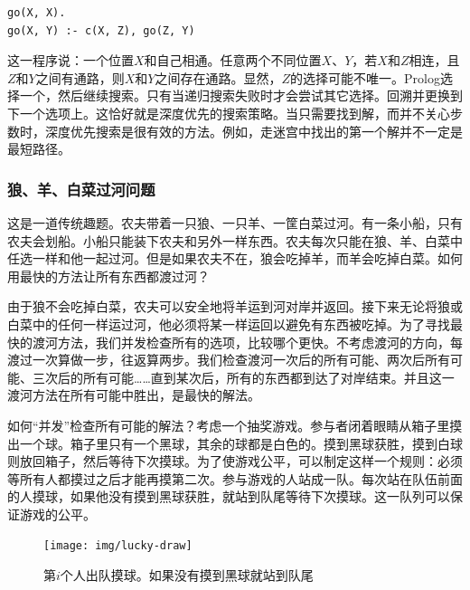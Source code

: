 \documentclass[b5paper]{ctexart}
\begin{document}
\lstset{language=Prolog}
\begin{lstlisting}
go(X, X).
go(X, Y) :- c(X, Z), go(Z, Y)
\end{lstlisting}

这一程序说：一个位置$X$和自己相通。任意两个不同位置$X$、$Y$，若$X$和$Z$相连，且$Z$和$Y$之间有通路，则$X$和$Y$之间存在通路。显然，$Z$的选择可能不唯一。Prolog选择一个，然后继续搜索。只有当递归搜索失败时才会尝试其它选择。回溯并更换到下一个选项上。这恰好就是深度优先的搜索策略。当只需要找到解，而并不关心步数时，深度优先搜索是很有效的方法。例如，走迷宫中找出的第一个解并不一定是最短路径。

\subsubsection{狼、羊、白菜过河问题}

这是一道传统趣题。农夫带着一只狼、一只羊、一筐白菜过河。有一条小船，只有农夫会划船。小船只能装下农夫和另外一样东西。农夫每次只能在狼、羊、白菜中任选一样和他一起过河。但是如果农夫不在，狼会吃掉羊，而羊会吃掉白菜。如何用最快的方法让所有东西都渡过河？


由于狼不会吃掉白菜，农夫可以安全地将羊运到河对岸并返回。接下来无论将狼或白菜中的任何一样运过河，他必须将某一样运回以避免有东西被吃掉。为了寻找最快的渡河方法，我们并发检查所有的选项，比较哪个更快。不考虑渡河的方向，每渡过一次算做一步，往返算两步。我们检查渡河一次后的所有可能、两次后所有可能、三次后的所有可能……直到某次后，所有的东西都到达了对岸结束。并且这一渡河方法在所有可能中胜出，是最快的解法。

如何“并发”检查所有可能的解法？考虑一个抽奖游戏。参与者闭着眼睛从箱子里摸出一个球。箱子里只有一个黑球，其余的球都是白色的。摸到黑球获胜，摸到白球则放回箱子，然后等待下次摸球。为了使游戏公平，可以制定这样一个规则：必须等所有人都摸过之后才能再摸第二次。参与游戏的人站成一队。每次站在队伍前面的人摸球，如果他没有摸到黑球获胜，就站到队尾等待下次摸球。这一队列可以保证游戏的公平。

\begin{figure}[htbp]
 \centering
 \texttt{[image: img/lucky-draw]}
 \caption{第$i$个人出队摸球。如果没有摸到黑球就站到队尾}
 \label{fig:luck-draw}
\end{figure}
\end{document}

